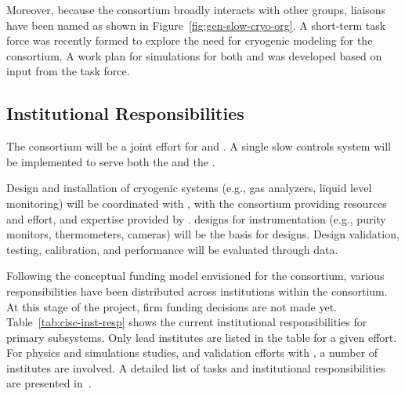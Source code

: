 Moreover, because the  consortium broadly interacts with other groups, liaisons have been named as shown in Figure~\ref{fig:gen-slow-cryo-org}. 
A short-term task force was recently formed to explore the need for cryogenic modeling for the consortium. A work plan for  simulations for both  and  was developed based on input from the task force. 


\subsection{Institutional Responsibilities}

The  consortium %
will be a joint effort for \single and \dual. A single slow controls system will be implemented to serve both the  and the .

Design and installation of cryogenic systems (e.g., gas analyzers, liquid level monitoring) will be coordinated with , with the consortium providing resources and effort, and expertise provided by .  designs for  instrumentation (e.g., purity monitors, thermometers, cameras) will be the basis for  designs. Design validation, testing, calibration, and performance will be evaluated through  data.

Following the conceptual funding model envisioned for the consortium, various responsibilities have been distributed across institutions within the consortium. At this stage of the project, firm funding decisions are not made yet.
Table~\ref{tab:cisc-inst-resp} shows the current institutional responsibilities for primary  subsystems. Only lead institutes are listed in the table for a given effort. For physics and simulations studies, and validation efforts with , a number of institutes are involved. A detailed list of tasks and institutional responsibilities are presented in~\cite{bib:docdb5609}.

